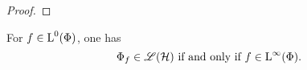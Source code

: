 \begin{proof}
% 
\end{proof}

\begin{lem} \label{maintheorem5}
  For $f \in {\text{L}^0}(\Phi)$, one has
\[
\Phi_f \in \mathscr{L}(\mathcal{H}) \text{ if and only if }f \in {\text{L}^\infty }(\Phi).
\]

 
\end{lem}

